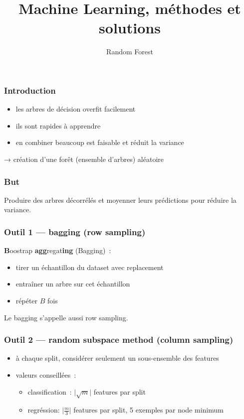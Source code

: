 \documentclass{formation}
\title{Machine Learning, méthodes et solutions}
\subtitle{Random Forest}
\begin{document}
\maketitle

\begin{frame}
  \frametitle{Introduction}
  \begin{itemize}
  \item les arbres de décision overfit facilement
  \item ils sont rapides à apprendre
  \item en combiner beaucoup est faisable et réduit la variance
  \end{itemize}
  → création d'une forêt (ensemble d'arbres) aléatoire
\end{frame}

\begin{frame}
  \frametitle{But}
  Produire des arbres décorrélés et moyenner leurs prédictions pour
  réduire la variance.
\end{frame}

\begin{frame}
  \frametitle{Outil 1 — bagging (row sampling)}
  \textbf{B}oostrap \textbf{agg}regat\textbf{ing} (Bagging) :
  \begin{itemize}
  \item tirer un échantillon du dataset avec replacement
  \item entraîner un arbre sur cet échantillon
  \item répéter $B$ fois
  \end{itemize}
  Le bagging s'appelle aussi row sampling.
\end{frame}

\begin{frame}
  \frametitle{Outil 2 — random subspace method (column sampling)}
  \begin{itemize}
  \item à chaque split, considérer seulement un sous-ensemble des
    features
  \item valeurs conseillées :
    \begin{itemize}
    \item classification : $\lvert\sqrt m\rvert$ features par split
    \item regréssion: $\lvert\frac{m}{3}\rvert$ features par split, 5
      exemples par node minimum
    \end{itemize}
  \end{itemize}
\end{frame}
\end{document}
